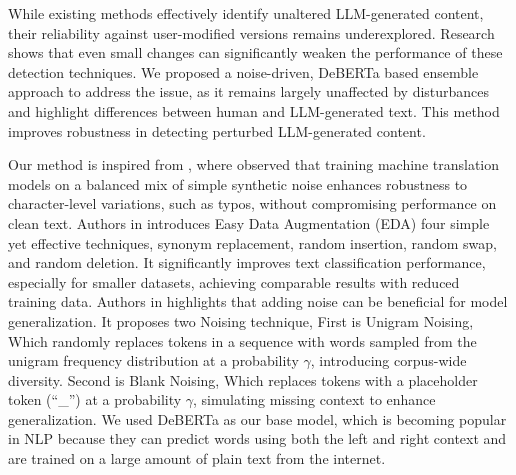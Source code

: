 While existing methods effectively identify unaltered LLM-generated content, their reliability against user-modified versions remains underexplored. Research shows that even small changes can significantly weaken the performance of these detection techniques. We proposed a noise-driven, DeBERTa based ensemble approach to address the issue, as it remains largely unaffected by disturbances and highlight differences between human and LLM-generated text. This method improves robustness in detecting perturbed LLM-generated content.

Our method is inspired from \cite{karpukhin2019training,wei-zou-2019-eda,xie2017data}, where \cite{karpukhin2019training} observed that training machine translation models on a balanced mix of simple synthetic noise enhances robustness to character-level variations, such as typos, without compromising performance on clean text. Authors in \cite{wei-zou-2019-eda} introduces Easy Data Augmentation (EDA) four simple yet effective techniques, synonym replacement, random insertion, random swap, and random deletion. It significantly improves text classification performance, especially for smaller datasets, achieving comparable results with reduced training data.
Authors in \cite{xie2017data} highlights that adding noise can be beneficial for model generalization. It proposes two Noising technique, First is Unigram Noising, Which randomly replaces tokens in a sequence with words sampled from the unigram frequency distribution at a probability \( \gamma \), introducing corpus-wide diversity. Second is Blank Noising, Which replaces tokens with a placeholder token (“\_”) at a probability \( \gamma \), simulating missing context to enhance generalization. We used DeBERTa \cite{he2020deberta} as our base model, which is becoming popular in NLP because they can predict words using both the left and right context and are trained on a large amount of plain text from the internet.